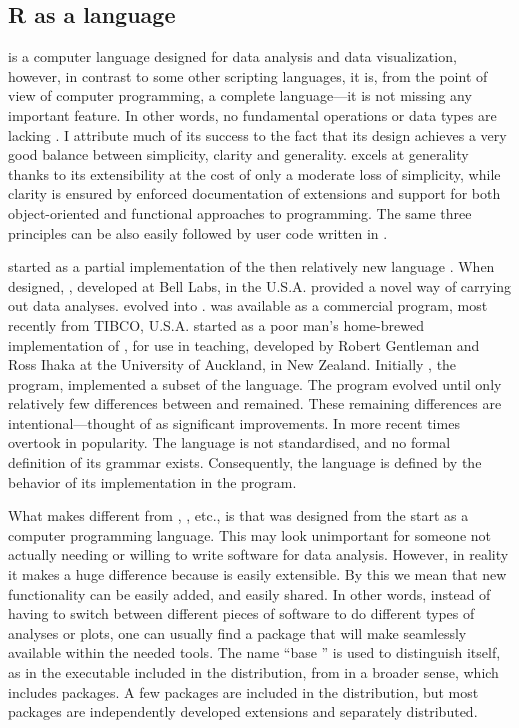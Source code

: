 \documentclass[krantz2]{krantz}\usepackage{knitr}
\begin{document}
\subsection{R as a language}
\Rlang is a computer language designed for data analysis and data visualization, however, in contrast to some other scripting languages, it is, from the point of view of computer programming, a complete language---it is not missing any important feature. In other words, no fundamental operations or data types are lacking \autocite{Chambers2016}. I attribute much of its success to the fact that its design achieves a very good balance between simplicity, clarity and generality. \Rlang excels at generality thanks to its extensibility at the cost of only a moderate loss of simplicity, while clarity is ensured by enforced documentation of extensions and support for both object-oriented and functional approaches to programming. The same three principles can be also easily followed by user code written in \Rlang.

\Rlang started as a partial implementation of the then relatively new \Slang language \autocite{Becker1984,Becker1988}. When designed, \Slang, developed at Bell Labs, in the U.S.A. provided a novel way of carrying out data analyses. \Slang evolved into \Splang \autocite{Becker1988}. \Splang was available as a commercial program, most recently from TIBCO, U.S.A. \Rlang started as a poor man's home-brewed implementation of \Slang, for use in teaching, developed by Robert Gentleman and Ross Ihaka at the University of Auckland, in New Zealand. Initially \Rpgrm, the program, implemented a subset of the \Slang language. The \Rpgrm program evolved until only relatively few differences between \Slang and \Rlang remained. These remaining differences are intentional---thought of as significant improvements. In more recent times \Rlang overtook \Splang in popularity. The \Rlang language is not standardised, and no formal definition of its grammar exists. Consequently, the \Rlang language is defined by the behavior of its implementation in the \Rpgrm program.

What makes \Rlang different from , , etc., is that \Slang was designed from the start as a computer programming language. This may look unimportant for someone not actually needing or willing to write software for data analysis. However, in reality it makes a huge difference because \Rlang is easily extensible. By this we mean that new functionality can be easily added, and easily shared. In other words, instead of having to switch between different pieces of software to do different types of analyses or plots, one can usually find a package that will make seamlessly available within \Rlang the needed tools. The name ``base \Rlang{}'' is used to distinguish \Rlang itself, as in the \Rpgrm executable included in the \Rpgrm distribution, from \Rlang in a broader sense, which includes packages. A few packages are included in the \Rpgrm distribution, but most \Rlang packages are independently developed extensions and separately distributed.
\end{document}
